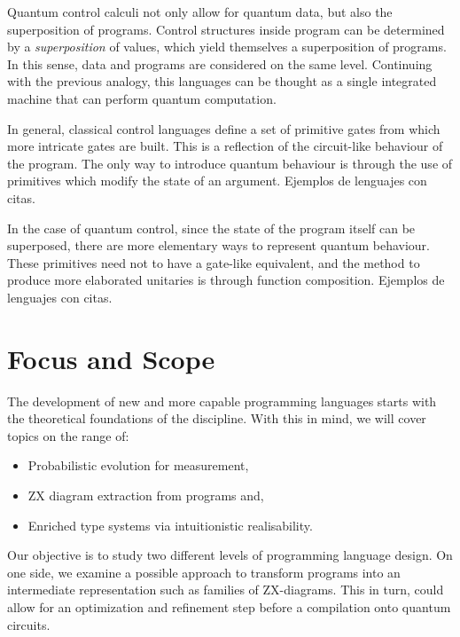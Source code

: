 Quantum control calculi not only allow for quantum data, but also the superposition
of programs. Control structures inside program can be determined by a \emph{
superposition} of values, which yield themselves a superposition of programs.
In this sense, data and programs are considered on the same level. Continuing
with the previous analogy, this languages can be thought as a single integrated
machine that can perform quantum computation.

In general, classical control languages define a set of primitive gates from which
more intricate gates are built. This is a reflection of the circuit-like behaviour
of the program. The only way to introduce quantum behaviour is through the use of
primitives which modify the state of an argument.
{\color{red} Ejemplos de lenguajes con citas.} 

In the case of quantum control, since the state of the program itself can be
superposed, there are more elementary ways to represent quantum behaviour.
These primitives need not to have a gate-like equivalent, and the method to produce
more elaborated unitaries is through function composition.
{\color{red} Ejemplos de lenguajes con citas.}

\section{Focus and Scope}
The development of new and more capable programming languages starts with the
theoretical foundations of the discipline. With this in mind, we will cover
topics on the range of:
\begin{itemize}
    \item Probabilistic evolution for measurement,
    \item ZX diagram extraction from programs and,
    \item Enriched type systems via intuitionistic realisability.
\end{itemize}

Our objective is to study two different levels of programming language design.
On one side, we examine a possible approach to transform programs into an
intermediate representation such as families of ZX-diagrams. This in turn,
could allow for an optimization and refinement step before a compilation onto
quantum circuits.

